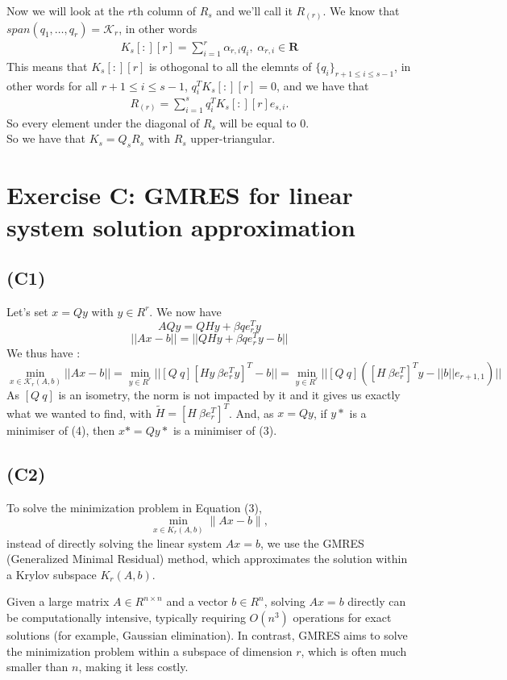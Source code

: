 \documentclass{article}
\begin{document}
Now we will look at the $r$th column of $R_s$ and we'll call it $R_{(r)}$. We know that $span(q_1, \dots, q_r) = \mathcal{K}_r$, in other words 
\begin{align*}
    K_s[:][r]=\sum_{i=1}^{r}\alpha_{r,i}q_i, \hspace{3pt} \alpha_{r,i} \in \mathbf{R}
\end{align*}
This means that $K_s[:][r]$ is othogonal to all the elemnts of $\{ q_i \}_{r+1 \leq i \leq s-1}$, in other words for all $r+1 \leq i \leq s-1$, $q_i^TK_s[:][r]=0$, and we have that
\begin{align*}
    R_{(r)} = \sum_{i=1}^{s} q_i^TK_s[:][r]e_{s,i}.
\end{align*}
So every element under the diagonal of $R_s$ will be equal to $0$.\\
So we have that $K_s=Q_sR_s$ with $R_s$ upper-triangular.

\newpage
\section{Exercise C: GMRES for linear system solution approximation}
\subsection*{(C1)}
Let's set $x = Qy$ with $y \in R^r$. We now have
\[
AQy = QHy + \beta q e_r^T y
\]
\[
||Ax-b|| = ||QHy + \beta q e_r^T y -b ||
\]
We thus have :
\[
\min_{x \in \mathcal{K}_r(A,b)} ||Ax-b|| = \min_{y \in R^r} ||
[Q ~ q] [Hy ~\beta e_r^Ty]^T - b||
= \min_{y \in R^r} ||
[Q ~ q]( [H ~\beta e_r^T]^T y - ||b|| e_{r+1,1})||
\]
As $[Q ~ q]$ is an isometry, the norm is not impacted by it and it gives us exactly what we wanted to find, with $\tilde{H}= [H ~\beta e_r^T]^T$.
And, as $x = Qy$, if 
$y*$ is a minimiser of (4), then $x* = Qy*$ is a minimiser of (3). 

\subsection*{(C2)}

To solve the minimization problem in Equation (3),
\[
\min_{x \in K_r(A, b)} \|Ax - b\|,
\]
instead of directly solving the linear system $ Ax = b $, we use the GMRES (Generalized Minimal Residual) method, which approximates the solution within a Krylov subspace $ K_r(A, b) $. 

Given a large matrix $ A \in R^{n \times n} $ and a vector $ b \in R^n $, solving $ Ax = b $ directly can be computationally intensive, 
typically requiring $ O(n^3) $ operations for exact solutions (for example, Gaussian elimination). In contrast, GMRES aims to solve the minimization problem within a subspace 
of dimension $ r $, which is often much smaller than $ n $, making it less costly.
\end{document}

